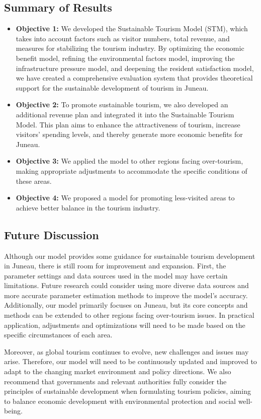 \documentclass{mcmthesis}
\begin{document}
\subsection{Summary of Results}
\begin{itemize}
  \item \textbf{Objective 1:} {We developed the Sustainable Tourism Model (STM), which takes into account factors such as visitor numbers, total revenue, and measures for stabilizing the tourism industry. By optimizing the economic benefit model, refining the environmental factors model, improving the infrastructure pressure model, and deepening the resident satisfaction model, we have created a comprehensive evaluation system that provides theoretical support for the sustainable development of tourism in Juneau.}
  \item \textbf{Objective 2:} {To promote sustainable tourism, we also developed an additional revenue plan and integrated it into the Sustainable Tourism Model. This plan aims to enhance the attractiveness of tourism, increase visitors' spending levels, and thereby generate more economic benefits for Juneau.}
  \item \textbf{Objective 3:} {We applied the model to other regions facing over-tourism, making appropriate adjustments to accommodate the specific conditions of these areas.}
  \item \textbf{Objective 4:} {We proposed a model for promoting less-visited areas to achieve better balance in the tourism industry.}
\end{itemize}
\subsection{Future Discussion}
{Although our model provides some guidance for sustainable tourism development in Juneau, there is still room for improvement and expansion. First, the parameter settings and data sources used in the model may have certain limitations. Future research could consider using more diverse data sources and more accurate parameter estimation methods to improve the model's accuracy. Additionally, our model primarily focuses on Juneau, but its core concepts and methods can be extended to other regions facing over-tourism issues. In practical application, adjustments and optimizations will need to be made based on the specific circumstances of each area.\cite{7}}

{Moreover, as global tourism continues to evolve, new challenges and issues may arise. Therefore, our model will need to be continuously updated and improved to adapt to the changing market environment and policy directions. We also recommend that governments and relevant authorities fully consider the principles of sustainable development when formulating tourism policies, aiming to balance economic development with environmental protection and social well-being.}
\end{document}
